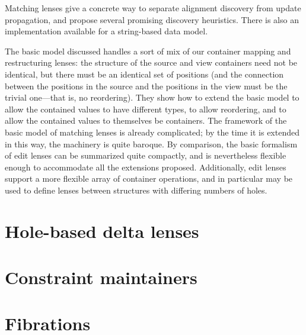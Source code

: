 Matching lenses give a concrete way to separate alignment discovery from
update propagation, and propose several promising discovery heuristics.
There is also an implementation available for a string-based data model.

The basic model discussed handles a sort of mix of our container mapping and
restructuring lenses: the structure of the source and view containers need
not be identical, but there must be an identical set of positions (and the
connection between the positions in the source and the positions in the view
must be the trivial one---that is, no reordering). They show how to extend
the basic model to allow the contained values to have different types, to
allow reordering, and to allow the contained values to themselves be
containers. The framework of the basic model of matching lenses is already
complicated; by the time it is extended in this way, the machinery is quite
baroque. By comparison, the basic formalism of edit lenses can be summarized
quite compactly, and is nevertheless flexible enough to accommodate all the
extensions proposed. Additionally, edit lenses support a more flexible array
of container operations, and in particular may be used to define lenses
between structures with differing numbers of holes.

\section{Hole-based delta lenses}
\label{sec:holes}
%

\section{Constraint maintainers}
\label{sec:constraint-maintainers}
%

\section{Fibrations}
\label{sec:fibrations}
%

